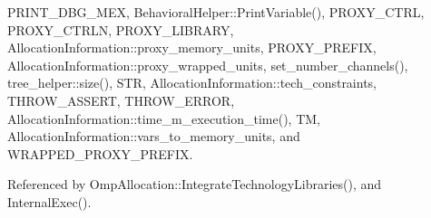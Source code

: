 P\+R\+I\+N\+T\+\_\+\+D\+B\+G\+\_\+\+M\+EX, Behavioral\+Helper\+::\+Print\+Variable(), P\+R\+O\+X\+Y\+\_\+\+C\+T\+RL, P\+R\+O\+X\+Y\+\_\+\+C\+T\+R\+LN, P\+R\+O\+X\+Y\+\_\+\+L\+I\+B\+R\+A\+RY, Allocation\+Information\+::proxy\+\_\+memory\+\_\+units, P\+R\+O\+X\+Y\+\_\+\+P\+R\+E\+F\+IX, Allocation\+Information\+::proxy\+\_\+wrapped\+\_\+units, set\+\_\+number\+\_\+channels(), tree\+\_\+helper\+::size(), S\+TR, Allocation\+Information\+::tech\+\_\+constraints, T\+H\+R\+O\+W\+\_\+\+A\+S\+S\+E\+RT, T\+H\+R\+O\+W\+\_\+\+E\+R\+R\+OR, Allocation\+Information\+::time\+\_\+m\+\_\+execution\+\_\+time(), TM, Allocation\+Information\+::vars\+\_\+to\+\_\+memory\+\_\+units, and W\+R\+A\+P\+P\+E\+D\+\_\+\+P\+R\+O\+X\+Y\+\_\+\+P\+R\+E\+F\+IX.



Referenced by Omp\+Allocation\+::\+Integrate\+Technology\+Libraries(), and Internal\+Exec().

